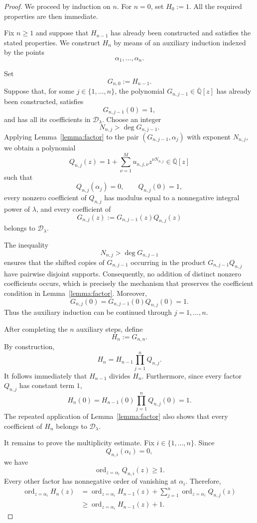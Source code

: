 \documentclass[10pt,a4paper]{amsart}
\numberwithin{equation}{section}
\newcommand{\Qbar}{\overline{\mathbb Q}}
\newcommand{\D}{\mathcal D}
\newcommand{\ord}{\operatorname{ord}}
\begin{document}
\begin{proof}
We proceed by induction on $n$. For $n=0$, set $H_0:=1$. All the required
properties are then immediate.

Fix $n\geq1$ and suppose that $H_{n-1}$ has already been constructed and
satisfies the stated properties. We construct $H_n$ by means of an
auxiliary induction indexed by the points
\[
        \alpha_1,\ldots,\alpha_n.
\]

Set
\[
        G_{n,0}:=H_{n-1}.
\]
Suppose that, for some $j\in\{1,\ldots,n\}$, the polynomial
$G_{n,j-1}\in\Qbar[z]$ has already been constructed, satisfies
\[
        G_{n,j-1}(0)=1,
\]
and has all its coefficients in $\D_\lambda$. Choose an integer
\[
        N_{n,j}>\deg G_{n,j-1}.
\]
Applying Lemma~\ref{lemma:factor} to the pair
$(G_{n,j-1},\alpha_j)$ with exponent $N_{n,j}$, we obtain a polynomial
\[
        Q_{n,j}(z)
        =
        1+\sum_{\nu=1}^{M}
        u_{n,j,\nu}z^{\nu N_{n,j}}
        \in\Qbar[z]
\]
such that
\[
        Q_{n,j}(\alpha_j)=0,
        \qquad
        Q_{n,j}(0)=1,
\]
every nonzero coefficient of $Q_{n,j}$ has modulus equal to a
nonnegative integral power of $\lambda$, and every coefficient of
\[
        G_{n,j}(z)
        :=
        G_{n,j-1}(z)Q_{n,j}(z)
\]
belongs to $\D_\lambda$.

The inequality
\[
        N_{n,j}>\deg G_{n,j-1}
\]
ensures that the shifted copies of $G_{n,j-1}$ occurring in the product
$G_{n,j-1}Q_{n,j}$ have pairwise disjoint supports. Consequently, no
addition of distinct nonzero coefficients occurs, which is precisely the
mechanism that preserves the coefficient condition in
Lemma~\ref{lemma:factor}. Moreover,
\[
        G_{n,j}(0)
        =
        G_{n,j-1}(0)Q_{n,j}(0)
        =
        1.
\]
Thus the auxiliary induction can be continued through
$j=1,\ldots,n$.

After completing the $n$ auxiliary steps, define
\[
        H_n:=G_{n,n}.
\]
By construction,
\[
        H_n
        =
        H_{n-1}\prod_{j=1}^{n}Q_{n,j}.
\]
It follows immediately that $H_{n-1}$ divides $H_n$. Furthermore, since
every factor $Q_{n,j}$ has constant term $1$,
\[
        H_n(0)
        =
        H_{n-1}(0)\prod_{j=1}^{n}Q_{n,j}(0)
        =
        1.
\]
The repeated application of Lemma~\ref{lemma:factor} also shows that every
coefficient of $H_n$ belongs to $\D_\lambda$.

It remains to prove the multiplicity estimate. Fix
$i\in\{1,\ldots,n\}$. Since
\[
        Q_{n,i}(\alpha_i)=0,
\]
we have
\[
        \ord_{z=\alpha_i}Q_{n,i}(z)\geq1.
\]
Every other factor has nonnegative order of vanishing at $\alpha_i$.
Therefore,
\begin{align*}
        \ord_{z=\alpha_i}H_n(z)
        &=
        \ord_{z=\alpha_i}H_{n-1}(z)
        +
        \sum_{j=1}^{n}
        \ord_{z=\alpha_i}Q_{n,j}(z)\\
        &\geq
        \ord_{z=\alpha_i}H_{n-1}(z)+1.
\end{align*}


\end{proof}
\end{document}
